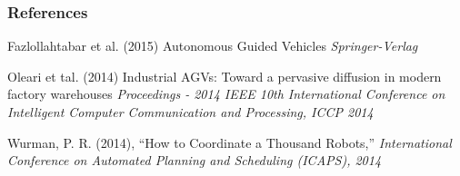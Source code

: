 \documentclass{beamer}
\begin{document}
\begin{frame}
\frametitle{References}
\footnotesize{
\begin{thebibliography}{99} %
 Fazlollahtabar et al. (2015)
\newblock Autonomous Guided Vehicles
\newblock \emph{Springer-Verlag}

 Oleari et tal. (2014)
\newblock Industrial AGVs: Toward a pervasive diffusion in modern factory warehouses
\newblock \emph{Proceedings - 2014 IEEE 10th International Conference on Intelligent Computer Communication and Processing, ICCP 2014}

Wurman, P. R. (2014), 
\newblock “How to Coordinate a Thousand Robots,” 
\newblock \emph{International Conference on Automated Planning and Scheduling (ICAPS), 2014}

\end{thebibliography}
}
\end{frame}
\end{document}

